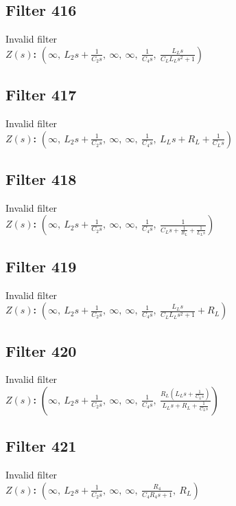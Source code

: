 \documentclass{article}
\begin{document}
\subsection*{Filter 416}
Invalid filter \\ 
\textbf{$Z(s)$:} $\left( \infty, \  L_{2} s + \frac{1}{C_{2} s}, \  \infty, \  \infty, \  \frac{1}{C_{4} s}, \  \frac{L_{L} s}{C_{L} L_{L} s^{2} + 1}\right)$ \\ 
\subsection*{Filter 417}
Invalid filter \\ 
\textbf{$Z(s)$:} $\left( \infty, \  L_{2} s + \frac{1}{C_{2} s}, \  \infty, \  \infty, \  \frac{1}{C_{4} s}, \  L_{L} s + R_{L} + \frac{1}{C_{L} s}\right)$ \\ 
\subsection*{Filter 418}
Invalid filter \\ 
\textbf{$Z(s)$:} $\left( \infty, \  L_{2} s + \frac{1}{C_{2} s}, \  \infty, \  \infty, \  \frac{1}{C_{4} s}, \  \frac{1}{C_{L} s + \frac{1}{R_{L}} + \frac{1}{L_{L} s}}\right)$ \\ 
\subsection*{Filter 419}
Invalid filter \\ 
\textbf{$Z(s)$:} $\left( \infty, \  L_{2} s + \frac{1}{C_{2} s}, \  \infty, \  \infty, \  \frac{1}{C_{4} s}, \  \frac{L_{L} s}{C_{L} L_{L} s^{2} + 1} + R_{L}\right)$ \\ 
\subsection*{Filter 420}
Invalid filter \\ 
\textbf{$Z(s)$:} $\left( \infty, \  L_{2} s + \frac{1}{C_{2} s}, \  \infty, \  \infty, \  \frac{1}{C_{4} s}, \  \frac{R_{L} \left(L_{L} s + \frac{1}{C_{L} s}\right)}{L_{L} s + R_{L} + \frac{1}{C_{L} s}}\right)$ \\ 
\subsection*{Filter 421}
Invalid filter \\ 
\textbf{$Z(s)$:} $\left( \infty, \  L_{2} s + \frac{1}{C_{2} s}, \  \infty, \  \infty, \  \frac{R_{4}}{C_{4} R_{4} s + 1}, \  R_{L}\right)$ \\ 
\end{document}
